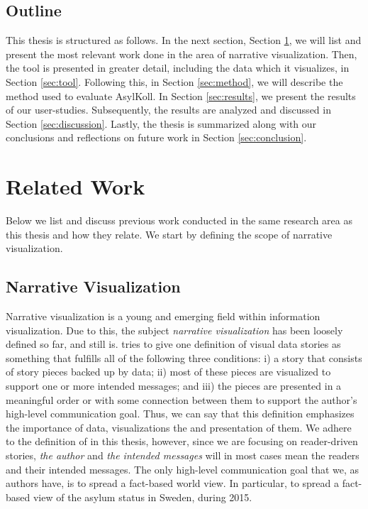 \documentclass{acmtog} %
\begin{document}

\subsection{Outline}
\label{sub:outline}
This thesis is structured as follows. In the next section, Section \ref{sec:relwork}, we will list and present the most relevant work done in the area of narrative visualization. Then, the tool is presented in greater detail, including the data which it visualizes, in Section \ref{sec:tool}. Following this, in Section \ref{sec:method}, we will describe the method used to evaluate AsylKoll. In Section \ref{sec:results}, we present the results of our user-studies. Subsequently, the results are analyzed and discussed in Section \ref{sec:discussion}. Lastly, the thesis is summarized along with our conclusions and reflections on future work in Section \ref{sec:conclusion}.

\section{Related Work}
\label{sec:relwork}

Below we list and discuss previous work conducted in the same research area as this thesis and how they relate. We start by defining the scope of narrative visualization.

\subsection{Narrative Visualization}
\label{sub:narr_vis}
Narrative visualization is a young and emerging field within information visualization. Due to this, the subject \emph{narrative visualization} has been loosely defined so far, and still is. \citet{lee2015more} tries to give one definition of visual data stories as something that fulfills all of the following three conditions: i) a story that consists of story pieces backed up by data; ii) most of these pieces are visualized to support one or more intended messages; and iii) the pieces are presented in a meaningful order or with some connection between them to support the author's high-level communication goal. Thus, we can say that this definition emphasizes the importance of data, visualizations the and presentation of them. We adhere to the definition of \citet{lee2015more} in this thesis, however, since we are focusing on reader-driven stories, \emph{the author} and \emph{the intended messages} will in most cases mean the readers and their intended messages. The only high-level communication goal that we, as authors have, is to spread a fact-based world view. In particular, to spread a fact-based view of the asylum status in Sweden, during 2015.
\end{document}
